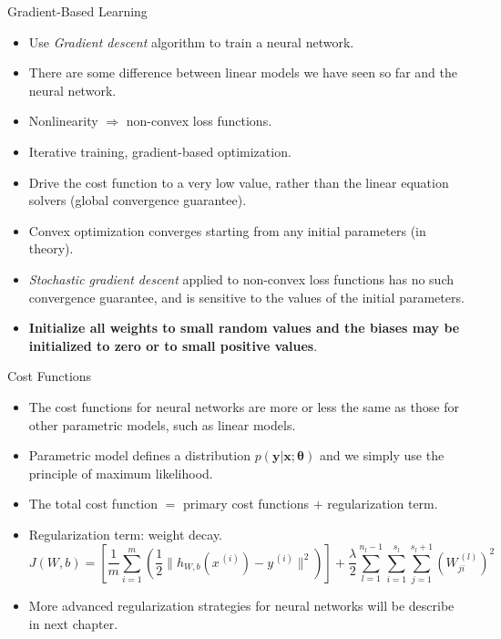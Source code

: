 \documentclass[10pt]{beamer}
\begin{document}
	\begin{frame}{Gradient-Based Learning}
		\begin{itemize}
			\item Use \emph{Gradient descent} algorithm to train a neural network.
			\pause
			\item There are some difference between linear models we have seen so far and the neural network.
			\pause
			\item Nonlinearity $\Longrightarrow$ non-convex loss functions.
			\pause
			\item Iterative training, gradient-based optimization.
			\pause
			\item Drive the cost function to a very low value, rather than the linear equation solvers (global convergence guarantee).
			\pause
			\item Convex optimization converges starting from any initial parameters (in theory).
			\pause
			\item \emph{Stochastic gradient descent} applied to non-convex loss functions has no such convergence guarantee, and is sensitive to the values of the initial parameters.
			\pause
			\item \textbf{Initialize all weights to small random values and the biases may be initialized to zero or to small positive values}.
		\end{itemize}
	\end{frame}
	
	\begin{frame}{Cost Functions}
		\begin{itemize}
			\item The cost functions for neural networks are more or less the same as those for other parametric models, such as linear models.
			\pause
			\item Parametric model defines a distribution $p(\bm{y}|\bm{x};\bm{\theta})$ and we simply use the principle of maximum likelihood.
			\pause
			\item The total cost function $=$ primary cost functions $+$ regularization term.
			\pause
			\item Regularization term: weight decay.
			\begin{equation*}
				J(W,b)=\left[\frac{1}{m}\sum_{i=1}^m(\frac{1}{2}\lVert h_{W,b}(x^{\,(i)})-y^{\,(i)}\rVert^2)\right]+\frac{\lambda}{2}\sum_{l=1}^{n_l-1}\sum_{i=1}^{s_l}\sum_{j=1}^{s_l+1}\left(W_{ji}^{\,(l)}\right)^2
			\end{equation*}
			\pause
			\item More advanced regularization strategies for neural networks will be describe in next chapter.
		\end{itemize}
	\end{frame}
	
\end{document}
